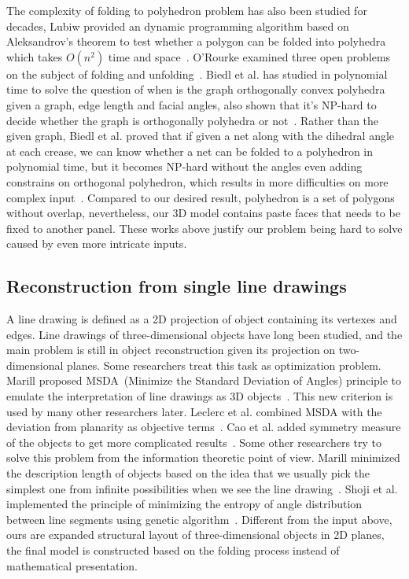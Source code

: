 The complexity of folding to polyhedron problem has also been studied for decades, Lubiw provided an dynamic programming algorithm based on Aleksandrov's theorem to test whether a polygon can be folded into polyhedra which takes $O(n^2)$ time and space~\cite{Lubiw1996When}. 
O'Rourke examined three open problems on the subject of folding and unfolding~\cite{O'Rourke:1998:FUC:646319.686376}. 
Biedl et al. has studied in polynomial time to solve the question of when is the graph orthogonally convex polyhedra given a graph, edge length and facial angles, also shown that it's NP-hard to decide whether the graph is orthogonally polyhedra or not~\cite{Biedl2004When}. Rather than the given graph, Biedl et al. proved that if given a net along with the dihedral angle at each crease, we can know whether a net can be folded to a polyhedron in polynomial time, but it becomes NP-hard without the angles even adding constrains on orthogonal polyhedron, which results in more difficulties on more complex input~\cite{Biedl:2005:NFP:1090462.1646553}.
Compared to our desired result, polyhedron is a set of polygons without overlap, nevertheless, our 3D model contains paste faces that needs to be fixed to another panel. 
These works above justify our problem being hard to solve caused by even more intricate inputs.

\subsection{Reconstruction from single line drawings} 
A line drawing is defined as a 2D projection of object containing its vertexes and edges. Line drawings of three-dimensional objects have long been studied, and the main problem is still in object reconstruction given its projection on two-dimensional planes. 
Some researchers treat this task as optimization problem. 
Marill proposed MSDA~(Minimize the Standard Deviation of Angles) principle to emulate the interpretation of line drawings as 3D objects~\cite{Marill:1991:EHI:113057.113061}. 
This new criterion is used by many other researchers later. 
Leclerc et al. combined MSDA with the deviation from planarity as objective terms~\cite{Leclerc1992An}. 
Cao et al. added symmetry measure of the objects to get more complicated results~\cite{Cao:2005:ORS:1097114.1097658}. 
Some other researchers try to solve this problem from the information theoretic point of view. 
Marill minimized the description length of objects based on the idea that we usually pick the simplest one from infinite possibilities when we see the line drawing~\cite{Marill1992Why}. 
Shoji et al. implemented the principle of minimizing the entropy of angle distribution between line segments using genetic algorithm~\cite{Shoji20013}. 
%
Different from the input above, ours are expanded structural layout of three-dimensional objects in 2D planes, the final model is constructed based on the folding process instead of mathematical presentation.

